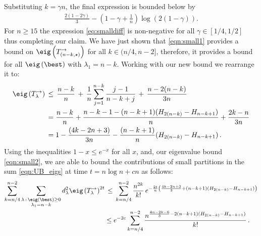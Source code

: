 \documentclass[11pt]{report}
\begin{document}
Substituting $k=\gamma n$, the final expression is bounded below by
\begin{eqnarray}
\frac{2(1-2\gamma)}{3} - \left(1-\gamma 
+\frac{1}{n}\right)\log(2(1-\gamma)) 
\label{eq:smalldiff}.
\end{eqnarray}
For $n\geq 15$ the expression \eqref{eq:smalldiff} is non-negative for all 
$\gamma \in [1/4,1/2]$ thus completing our claim. We have just shown that \eqref{eqn:small1} provides a bound on 
$\eig\left(T_{(n-k,\star)}^{\rightarrow}\right)$ for all $k\in(n/4,n-2]$, 
therefore, it provides a bound for all $\eig\left(\best \right)$ with 
$\lambda_{1} =n-k$.
Working with our new bound we rearrange it to:
\begin{align}
\eig\left(T_{\lambda}^{\rightarrow}\right) \,&\le\, \frac{n-k}{n} \,+\, 
\frac 1n \sum_{j=1}^{n-k} 
\frac{j-1}{n-k+j} \, + \,  \frac{n-2(n-k)}{3n} \nonumber\\
&= \frac{n-k}{n} + \frac{n-k-1 - (n-k+1)(H_{2(n-k)} -H_{n-k +1})}{n} +  
\frac{2k-n}{3n} \nonumber\\ 
& = 1 -\frac{(4k-2n+3)}{3n} - \frac{(n-k+1)}{n}(H_{2(n-k)} -H_{n-k +1})\, 
\label{eqn:small2}.
\end{align}
Using the inequalities $1-x \leq e^{-x}$ for all $x$, and, our eigenvalue 
bound 
\eqref{eqn:small2},
we are able to bound the 
contributions of small partitions in the sum \eqref{eqn:UB_eigs} at time $t=n\log n +cn$ as follows:
\begin{align}
\sum_{k=n/4}^{n-2}
\sum_{\substack{\lambda\,:\,\eig(\best)\ge 0\\ \lambda_{1}=n-k}} 
d_{\lambda}^{2} \eig\left(T_{\lambda}^{\rightarrow}\right)^{2t}
& \, \leq\,   	\sum_{k=n/4}^{n-2} \frac{n^{2k}}{k!}\,
e^{-\frac{2t}{n}\left(\frac{4k-2n+3}{3} + (n-k+1)(H_{2(n-k)} -H_{n-k +1})\right)}\nonumber \\
& \leq   
e^{-2c}\sum_{k =n/4}^{n-2} 
\frac{n^{\frac{4n-2k-6}{3}-2(n-k+1)(H_{2(n-k)} -H_{n-k +1})}}{k!}\,. 
\label{sum_small2}
\end{align}
\end{document}
